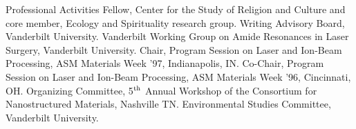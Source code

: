 \begin{rubric}{Professional Activities}
\entry*[2004--2007]Fellow, Center for the Study of Religion and Culture and core member, Ecology and Spirituality research group.
\entry*[2004--2009]Writing Advisory Board, Vanderbilt University.
\entry*[1999--2000]Vanderbilt Working Group on Amide Resonances in Laser Surgery, Vanderbilt University.
\entry*[1997]Chair, Program Session on Laser and Ion-Beam Processing, ASM Materials Week '97, Indianapolis, IN.
\entry*[1996]Co-Chair, Program Session on Laser and Ion-Beam Processing, ASM Materials Week '96, Cincinnati, OH.
\entry*[1996]Organizing Committee, 5$^{\mbox{\scriptsize th}}$ Annual Workshop of the Consortium for Nanostructured Materials, Nashville TN.
\entry*[1995--1996]Environmental Studies Committee, Vanderbilt University.
\end{rubric}
